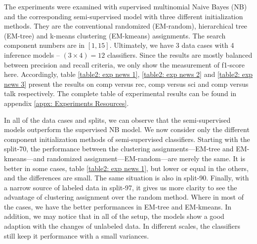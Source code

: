 The experiments were examined with supervised multinomial Naive Bayes (NB) and the corresponding semi-supervised model with three different initialization methods. They are the conventional randomized (EM-random), hierarchical tree (EM-tree) and k-means clustering (EM-kmeans) assignments. The search component numbers are in $[1, 15]$. Ultimately, we have 3 data cases with 4 inference models -- $(3 \times 4) = 12$ classifiers. Since the results are mostly balanced between precision and recall criteria, we only show the measurement of f1-score here. Accordingly, table \ref{table2: exp news 1}, \ref{table2: exp news 2} and \ref{table2: exp news 3} present the results on comp versus rec, comp versus sci and comp versus talk respectively. The complete table of experimental results can be found in appendix \ref{appx: Experiments Resources}.

In all of the data cases and splits, we can observe that the semi-supervised models outperform the supervised NB model. We now consider only the different component initialization methods of semi-supervised classifiers. Starting with the split-70, the performance between the clustering assignments---EM-tree and EM-kmeans---and randomized assignment---EM-random---are merely the same. It is better in some cases, table \ref{table2: exp news 1}, but lower or equal in the others, and the differences are small. The same situation is also in split-90. Finally, with a narrow source of labeled data in split-97, it gives us more clarity to see the advantage of clustering assignment over the random method. Where in most of the cases, we have the better performances in EM-tree and EM-kmeans. In addition, we may notice that in all of the setup, the models show a good adaption with the changes of unlabeled data. In different scales, the classifiers still keep it performance with a small variances.

\pagebreak





